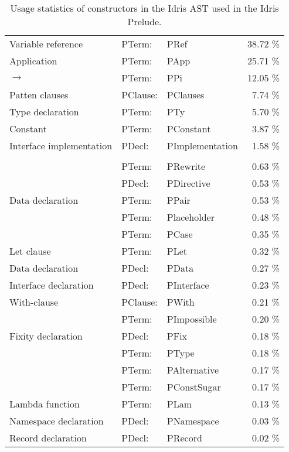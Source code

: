 \begin{table}[h]
  \caption {Usage statistics of constructors in the Idris AST used in the Idris
  Prelude.}
  \label{tbl:stats}
\begin{center}
  \begin{tabular}{ l l l r }
    Variable reference       & PTerm:   &    PRef            &    38.72 \% \\
    Application              & PTerm:   &    PApp            &    25.71 \% \\
    $\rightarrow$            & PTerm:   &    PPi             &    12.05 \% \\
    Patten clauses           & PClause: &    PClauses        &    7.74  \% \\
    Type declaration         & PTerm:   &    PTy             &    5.70  \% \\
    Constant                 & PTerm:   &    PConstant       &    3.87  \% \\
    Interface implementation & PDecl:   &    PImplementation &    1.58  \% \\
    \\
                             & PTerm:   &    PRewrite        &    0.63  \% \\
                             & PDecl:   &    PDirective      &    0.53  \% \\
    Data declaration         & PTerm:   &    PPair           &    0.53  \% \\
                             & PTerm:   &    Placeholder     &    0.48  \% \\
                             & PTerm:   &    PCase           &    0.35  \% \\
    Let clause               & PTerm:   &    PLet            &    0.32  \% \\
    Data declaration         & PDecl:   &    PData           &    0.27  \% \\
    Interface declaration    & PDecl:   &    PInterface      &    0.23  \% \\
    With-clause              & PClause: &    PWith           &    0.21  \% \\
                             & PTerm:   &    PImpossible     &    0.20  \% \\
    Fixity declaration       & PDecl:   &    PFix            &    0.18  \% \\
                             & PTerm:   &    PType           &    0.18  \% \\
                             & PTerm:   &    PAlternative    &    0.17  \% \\
                             & PTerm:   &    PConstSugar     &    0.17  \% \\
    Lambda function          & PTerm:   &    PLam            &    0.13  \% \\
    Namespace declaration    & PDecl:   &    PNamespace      &    0.03  \% \\
    Record declaration       & PDecl:   &    PRecord         &    0.02  \% \\


\end{tabular}
\end{center}
\end{table}
